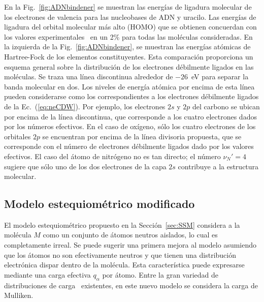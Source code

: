 En la Fig.~\ref{fig:ADNbindener} se muestran las energías de ligadura 
molecular de los electrones de valencia para las nucleobases de ADN y 
uracilo. Las energías de ligadura del orbital molecular más alto (HOMO) 
que se obtienen concuerdan con los valores 
experimentales~\cite{Hush,Verkin,Dougherty} en un 2\% para todas las 
moléculas consideradas. En la izquierda de la Fig.~\ref{fig:ADNbindener}, 
se muestran las energías atómicas de Hartree-Fock de los elementos 
constituyentes. Esta comparación proporciona un esquema general sobre la 
distribución de los electrones débilmente ligados en las moléculas. Se 
traza una línea discontinua alrededor de $-26$~eV para separar la banda 
molecular en dos. Los niveles de energía atómica por encima de esta 
línea pueden considerarse como los correspondientes a los electrones 
débilmente ligados de la Ec.~(\ref{eq:neCDW}). Por ejemplo, los 
electrones $2s$ y $2p$ del carbono se ubican por encima de la línea 
discontinua, que corresponde a los cuatro electrones dados por los 
números efectivos. En el caso de oxígeno, 
sólo los cuatro electrones de los orbitales $2p$ se encuentran por encima 
de la línea divisoria propuesta, que se corresponde con el número de 
electrones débilmente ligados dado por los valores efectivos. El caso 
del átomo de nitrógeno no es tan directo; el número $\nu_{N}'=4$ 
sugiere que sólo uno de los dos electrones de la capa $2s$ contribuye a
la estructura molecular.

\subsection{Modelo estequiométrico modificado}

El modelo estequiométrico propuesto en la Sección~\ref{sec:SSM} 
considera a la molécula $M$ como un conjunto de átomos neutros aislados, 
lo cual es completamente irreal. Se puede sugerir una primera mejora al 
modelo asumiendo que los átomos no son efectivamente neutros y que 
tienen una distribución electrónica dispar dentro de la molécula. Esta 
característica puede expresarse mediante una carga efectiva $q_{\alpha}$ 
por átomo. Entre la gran variedad de distribuciones de 
carga~\cite{lee2003} existentes, en este nuevo modelo se considera la 
carga de Mulliken.

